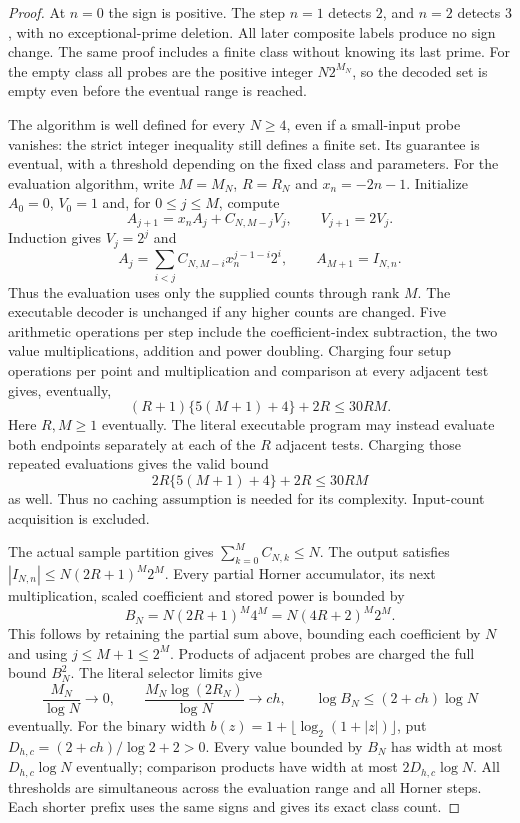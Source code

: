 \documentclass[11pt]{article}
\theoremstyle{definition}
\begin{document}
\begin{proof}
At $n=0$ the sign is positive.
The step $n=1$ detects $2$, and $n=2$ detects $3$, with no
exceptional-prime deletion.
All later composite labels produce no sign change.
The same proof includes a finite class without knowing its
last prime. For the empty class all probes are the positive
integer $N2^{M_N}$, so the decoded set is empty even before
the eventual range is reached.

The algorithm is well defined for every $N\ge4$, even if a
small-input probe vanishes: the strict integer inequality still
defines a finite set.
Its guarantee is eventual, with a threshold depending on the
fixed class and parameters.
For the evaluation algorithm, write $M=M_N$, $R=R_N$ and
$x_n=-2n-1$. Initialize $A_0=0$, $V_0=1$ and, for $0\le j\le M$, compute
\[
 A_{j+1}=x_nA_j+C_{N,M-j}V_j,\qquad V_{j+1}=2V_j .
\]
Induction gives $V_j=2^j$ and
\[
 A_j=\sum_{i<j}C_{N,M-i}x_n^{j-1-i}2^i,\qquad A_{M+1}=I_{N,n}.
\]
Thus the evaluation uses only the supplied counts through rank $M$.
The executable decoder is unchanged if any higher counts are changed.
Five arithmetic operations per step include the coefficient-index
subtraction, the two value multiplications, addition and power doubling.
Charging four setup operations per point and multiplication and
comparison at every adjacent test gives, eventually,
\[
 (R+1)\{5(M+1)+4\}+2R\le30RM .
\]
Here $R,M\ge1$ eventually. The literal executable program may instead
evaluate both endpoints separately at each of the $R$ adjacent tests.
Charging those repeated evaluations gives the valid bound
\[
 2R\{5(M+1)+4\}+2R\le30RM
\]
as well. Thus no caching assumption is needed for its complexity.
Input-count acquisition is excluded.

The actual sample partition gives $\sum_{k=0}^{M}C_{N,k}\le N$.
The output satisfies $|I_{N,n}|\le N(2R+1)^M2^M$.
Every partial Horner accumulator, its next multiplication,
scaled coefficient and stored power is bounded by
\[
 B_N=N(2R+1)^M4^M=N(4R+2)^M2^M .
\]
This follows by retaining the partial sum above, bounding each
coefficient by $N$ and using $j\le M+1\le2^M$.
Products of adjacent probes are charged the full bound $B_N^2$.
The literal selector limits give
\[
 \frac{M_N}{\log N}\longrightarrow0,\qquad
 \frac{M_N\log(2R_N)}{\log N}\longrightarrow ch,\qquad
 \log B_N\le(2+ch)\log N
\]
eventually. For the binary width
$b(z)=1+\lfloor\log_2(1+|z|)\rfloor$, put
$D_{h,c}=(2+ch)/\log2+2>0$.
Every value bounded by $B_N$ has width at most
$D_{h,c}\log N$ eventually; comparison products have width at most
$2D_{h,c}\log N$. All thresholds are simultaneous across the
evaluation range and all Horner steps.
Each shorter prefix uses the same signs and gives its exact class count.


\end{proof}
\end{document}
